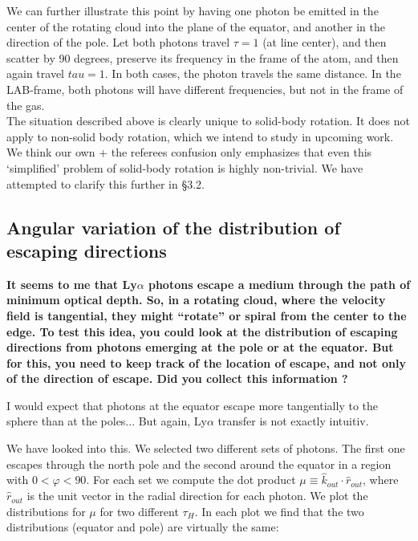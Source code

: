 \documentclass[12pt]{article}
\begin{document}
We can further illustrate this point by having one photon be emitted
in the center of the rotating cloud into the plane of the equator, and
another in the direction of the pole. Let both photons travel $\tau=1$
(at line center), and then scatter by 90 degrees, preserve its
frequency in the frame of the atom, and then again travel $tau=1$. In
both cases, the photon travels the same distance. In the LAB-frame,
both photons will have different frequencies, but not in the frame of
the gas.\\ 

The situation described above is clearly unique to solid-body
rotation. It does not apply to non-solid body rotation, which we
intend to study in upcoming work. We think our own + the referees
confusion only emphasizes that even this `simplified' problem of
solid-body rotation is highly non-trivial. We have attempted to
clarify this further in \S 3.2. 

\subsection*{Angular variation of the distribution of escaping directions}

{\bf It seems to me that Ly$\alpha$ photons escape a medium through
  the path of minimum optical depth. So, in a rotating cloud, where
  the velocity field is tangential, they might “rotate” or spiral from
  the center to the edge. To test this idea, you could look at the
  distribution of escaping directions from photons emerging at the
  pole or at the equator. But for this, you need to keep track of the
  location of escape, and not only of the direction of escape. Did you
  collect this information ? 
  
  I would expect that photons at the equator escape more tangentially to
  the sphere than at the poles... But again, Ly$\alpha$ transfer is not
  exactly intuitiv.} 

We have looked into this. We selected two different sets of
photons. The first one escapes through the north pole and the second
around the equator in a region with $0<\varphi<90$. For each set we
compute the dot product $\mu\equiv\hat{k}_{out}\cdot\hat{r}_{out}$,
where $\hat{r}_{out}$ is the unit vector in the radial direction for
each photon. We plot the distributions for $\mu$ for two different
$\tau_H$. In each plot we find that the two distributions (equator and
pole) are virtually the same: 
 
\end{document}
